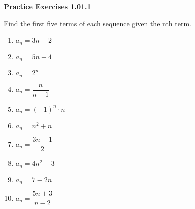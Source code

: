 \vspace{0.3ex}
\noindent\textbf{Practice Exercises 1.01.1}

\vspace{0.2ex}

Find the first five terms of each sequence given the nth term.
\begin{multicols}{2}
\begin{enumerate}
    \item $a_n = 3n + 2$
    \item $a_n = 5n - 4$
    \item $a_n = 2^n$
    \item $a_n = \dfrac{n}{n+1}$
    \item $a_n = (-1)^n \cdot n$
    \item $a_n = n^2 + n$
    \item $a_n = \dfrac{3n-1}{2}$
    \item $a_n = 4n^2 - 3$
    \item $a_n = 7 - 2n$
    \item $a_n = \dfrac{5n+3}{n-2}$
    \end{enumerate}
    \end{multicols}
